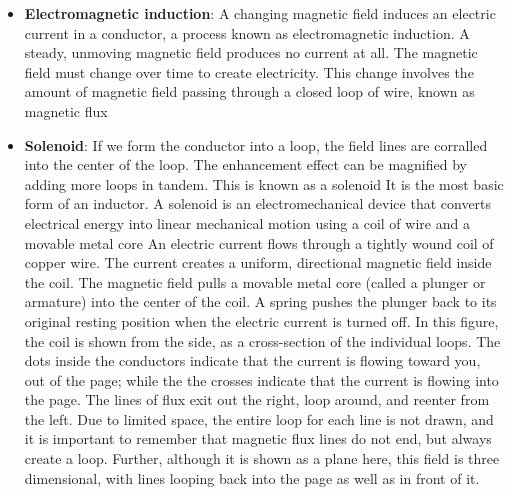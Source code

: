 \documentclass{report}
\begin{document}
\begin{itemize}
            \begin{align*}
                \text{Magnetic flux } \equiv \text{ the number of magnetic lines enclosed in a given area}
            .\end{align*}
            Note that the magnetic field runs the length of the conductor. The direction of the field lines follows the right hand rule: if you grasp the wire with your right hand such that your thumb is pointing in the direction of conventional current flow, then your fingers wrap in the direction of the magnetic field.
        \item \textbf{Electromagnetic induction}: A changing magnetic field induces an electric current in a conductor, a process known as electromagnetic induction.
            \bigbreak \noindent 
            A steady, unmoving magnetic field produces no current at all. The magnetic field must change over time to create electricity. This change involves the amount of magnetic field passing through a closed loop of wire, known as magnetic flux
        \item \textbf{Solenoid}: If we form the conductor into a loop, the field lines are corralled into the center of the loop.
            \bigbreak \noindent 
            \bigbreak \noindent 
            The enhancement effect can be magnified by adding more loops in tandem. This is known as a solenoid It is the most basic form of an inductor.
            \bigbreak \noindent 
            A solenoid is an electromechanical device that converts electrical energy into linear mechanical motion using a coil of wire and a movable metal core
            \bigbreak \noindent 
            An electric current flows through a tightly wound coil of copper wire. The current creates a uniform, directional magnetic field inside the coil. The magnetic field pulls a movable metal core (called a plunger or armature) into the center of the coil. A spring pushes the plunger back to its original resting position when the electric current is turned off.
            \bigbreak \noindent 
            \bigbreak \noindent 
            \bigbreak \noindent 
            \bigbreak \noindent 
            In this figure, the coil is shown from the side, as a cross-section of the individual loops. The dots inside the conductors indicate that the current is flowing toward you, out of the page; while the the crosses indicate that the current is flowing into the page. The lines of flux exit out the right, loop around, and reenter from the left. Due to limited space, the entire loop for each line is not drawn, and it is important to remember that magnetic flux lines do not end, but always create a loop. Further, although it is shown as a plane here, this field is three dimensional, with lines looping back into the page as well as in front of it.

\end{itemize}
\end{document}

